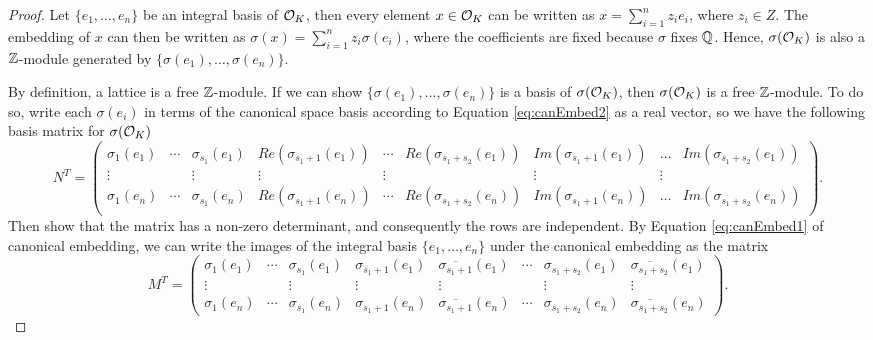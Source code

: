 \documentclass[../main.tex]{subfiles}
\begin{document}
\begin{proof}	
	Let $\{e_1,\dots,e_n\}$ be an integral basis of $\mathcal{O}_K$, then every element $x \in \mathcal{O}_K$ can be written as $x=\sum_{i=1}^n z_i e_i$, where $z_i \in Z$. The embedding of $x$ can then be written as $\sigma(x)=\sum_{i=1}^n z_i \sigma(e_i)$, where the coefficients are fixed because $\sigma$ fixes $\mathbb{Q}$. Hence, $\sigma(\mathcal{O}_K)$ is also a $\mathbb{Z}$-module generated by $\{\sigma(e_1),\dots,\sigma(e_n)\}$. 
	
	By definition, a lattice is a free $\mathbb{Z}$-module. If we can show $\{\sigma(e_1),\dots,\sigma(e_n)\}$ is a basis of $\sigma(\mathcal{O}_K)$, then $\sigma(\mathcal{O}_K)$ is a free $\mathbb{Z}$-module. To do so, write each $\sigma(e_i)$ in terms of the canonical space basis according to Equation \ref{eq:canEmbed2} as a real vector, so we have the following basis matrix for $\sigma(\mathcal{O}_K)$
	\begin{equation*}
	N^T = \left(
	\begin{smallmatrix}
	\sigma_1(e_1) & \cdots & \sigma_{s_1}(e_1) & Re(\sigma_{s_1+1}(e_1)) & \cdots & Re(\sigma_{s_1+s_2}(e_1)) & Im(\sigma_{s_1+1}(e_1)) & \dots & Im(\sigma_{s_1+s_2}(e_1)) \\
	\vdots & & \vdots & \vdots & \vdots & & \vdots & \vdots \\
	\sigma_1(e_n) & \cdots & \sigma_{s_1}(e_n) & Re(\sigma_{s_1+1}(e_n)) & \cdots & Re(\sigma_{s_1+s_2}(e_n)) & Im(\sigma_{s_1+1}(e_n)) & \dots & Im(\sigma_{s_1+s_2}(e_n)) \\
	\end{smallmatrix}
	\right).
	\end{equation*}
	Then show that the matrix has a non-zero determinant, and consequently the rows are independent. By Equation \ref{eq:canEmbed1} of canonical embedding, we can write the images of the integral basis $\{e_1, \dots, e_n\}$ under the canonical embedding as the matrix
	\begin{equation*}
	M^T = \left(
	\begin{smallmatrix}
	\sigma_1(e_1) & \cdots & \sigma_{s_1}(e_1) & \sigma_{s_1+1}(e_1) & \overline{\sigma_{s_1+1}}(e_1) & \cdots & \sigma_{s_1+s_2}(e_1) & \overline{\sigma_{s_1+s_2}}(e_1) \\
	\vdots & & \vdots & \vdots & \vdots & & \vdots & \vdots \\
	\sigma_1(e_n) & \cdots & \sigma_{s_1}(e_n) & \sigma_{s_1+1}(e_n) & \overline{\sigma_{s_1+1}}(e_n) & \cdots & \sigma_{s_1+s_2}(e_n) & \overline{\sigma_{s_1+s_2}}(e_n)
	\end{smallmatrix}
	\right).
	\end{equation*}

\end{proof}
\end{document}
